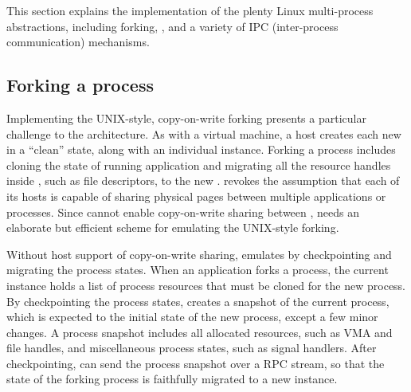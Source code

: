 This section explains the \thelibos{} implementation of
the plenty Linux multi-process abstractions,
including forking, , and a variety of IPC (inter-process communication) mechanisms. 




\subsection{Forking a process}



Implementing the UNIX-style, copy-on-write forking presents a particular challenge to the \graphene{} architecture.
As with a virtual machine, a \graphene{} host creates each new \picoproc{} in a ``clean'' state, along with an individual \thelibos{} instance. %
Forking a process includes cloning the state of running application and migrating all the resource handles inside \thelibos{}, such as file descriptors, to the new \picoproc{}.
\graphene{} revokes the assumption that each of its hosts is capable of sharing physical pages between multiple applications or processes.
Since \thelibos{} cannot enable copy-on-write sharing between \picoprocs{}, \thelibos{} needs an elaborate but efficient scheme for emulating the UNIX-style forking.


Without host support of copy-on-write sharing,
\thelibos{} emulates  by checkpointing and migrating the process states.
When an application forks a process,
the current \thelibos{} instance holds a list of process resources that must be cloned for the new process.
By checkpointing the process states,
\thelibos{} creates a snapshot of the current process,
which is expected to the initial state
of the new process,
except a few minor changes.
A process snapshot includes all allocated resources, such as VMA and file handles,
and miscellaneous process states, such as signal handlers.
After checkpointing,
\thelibos{} can send the process snapshot over a RPC stream, so that the state of the forking process is faithfully migrated to a new \thelibos{} instance.


